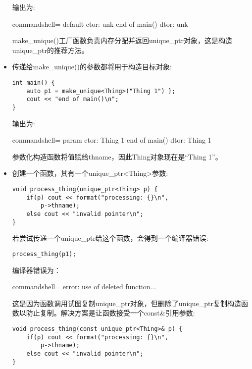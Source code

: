 \begin{itemize}
输出为:

\begin{tcblisting}{commandshell={}}
default ctor: unk
end of main()
dtor: unk
\end{tcblisting}

make\_unique()工厂函数负责内存分配并返回unique\_ptr对象，这是构造unique\_ptr的推荐方法。

\item 
传递给make\_unique()的参数都将用于构造目标对象:

\begin{lstlisting}[style=styleCXX]
int main() {
	auto p1 = make_unique<Thing>("Thing 1") };
	cout << "end of main()\n";
}
\end{lstlisting}

输出为:

\begin{tcblisting}{commandshell={}}
param ctor: Thing 1
end of main()
dtor: Thing 1
\end{tcblisting}

参数化构造函数将值赋给thname，因此Thing对象现在是“Thing 1”。

\item 
创建一个函数，其有一个unique\_ptr<Thing>参数:

\begin{lstlisting}[style=styleCXX]
void process_thing(unique_ptr<Thing> p) {
	if(p) cout << format("processing: {}\n",
		p->thname);
	else cout << "invalid pointer\n";
}
\end{lstlisting}

若尝试传递一个unique\_ptr给这个函数，会得到一个编译器错误:

\begin{lstlisting}[style=styleCXX]
process_thing(p1);
\end{lstlisting}

编译器错误为：

\begin{tcblisting}{commandshell={}}
error: use of deleted function...
\end{tcblisting}

这是因为函数调用试图复制unique\_ptr对象，但删除了unique\_ptr复制构造函数以防止复制。解决方案是让函数接受一个const\&引用参数:

\begin{lstlisting}[style=styleCXX]
void process_thing(const unique_ptr<Thing>& p) {
	if(p) cout << format("processing: {}\n",
		p->thname);
	else cout << "invalid pointer\n";
}
\end{lstlisting}


\end{itemize}
